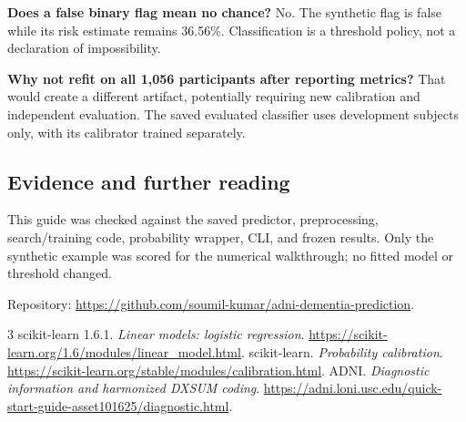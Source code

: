 \textbf{Does a false binary flag mean no chance?} No. The synthetic flag is false while its risk estimate remains 36.56\%. Classification is a threshold policy, not a declaration of impossibility.

\textbf{Why not refit on all 1,056 participants after reporting metrics?} That would create a different artifact, potentially requiring new calibration and independent evaluation. The saved evaluated classifier uses development subjects only, with its calibrator trained separately.

\subsection*{Evidence and further reading}
This guide was checked against the saved predictor, preprocessing, search/training code, probability wrapper, CLI, and frozen results. Only the synthetic example was scored for the numerical walkthrough; no fitted model or threshold changed.

Repository: \url{https://github.com/soumil-kumar/adni-dementia-prediction}.
\begin{thebibliography}{3}
 scikit-learn 1.6.1. \emph{Linear models: logistic regression}. \url{https://scikit-learn.org/1.6/modules/linear_model.html}.
 scikit-learn. \emph{Probability calibration}. \url{https://scikit-learn.org/stable/modules/calibration.html}.
 ADNI. \emph{Diagnostic information and harmonized DXSUM coding}. \url{https://adni.loni.usc.edu/quick-start-guide-asset101625/diagnostic.html}.
\end{thebibliography}

